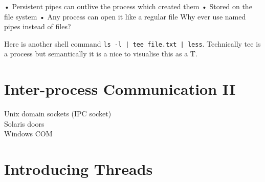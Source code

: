 • Persistent pipes can outlive the process which 
created them
• Stored on the file system
• Any process can open it like a regular file
 Why ever use named pipes instead of files?


\begin{example}
Here is another shell command \lstinline{ls -l | tee file.txt | less}.
Technically tee is a process but semantically it is a nice to
visualise this as a T. 
\end{example}



\section{Inter-process Communication II}

Unix domain sockets (IPC socket) \\
Solaris doors \\
Windows COM \\


\section{Introducing Threads}